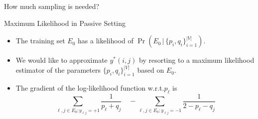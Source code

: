 \documentclass[10pt,svgnames,ignorenonframetext,final]{beamer}
\providecommand{\largelist}{%
  \setlength{\itemsep}{8pt}\setlength{\parskip}{3pt}}
\begin{document}
\begin{frame}{How much sampling is needed?}



\end{frame}

\begin{frame}{Maximum Likelihood in Passive Setting}

  \begin{itemize}[<+->]
    \largelist
  \item
    The training set \(E_0\) has a likelihood of $\Pr\left(E_0\,|\, \{p_i, q_i\}_{i=1}^{|V|}\right)$.

  \item
    We would like to \alert{approximate \(y^*(i,j)\)} by resorting to a maximum
    likelihood estimator of the parameters \(\{p_i, q_i\}_{i=1}^{|V|}\)
    based on \(E_0\).

  \item 
    The gradient of the log-likelihood function w.r.t.\@ $p_\ell$ is
    \begin{equation*}
      \sum_{\ell,j\in E_0; y_{\ell j}=+1} \frac{1}{p_\ell+q_j} \quad-
      \sum_{\ell,j\in E_0; y_{\ell j}=-1} \frac{1}{2-p_\ell-q_j}
    \end{equation*}
\end{itemize}

\end{frame}
\end{document}

